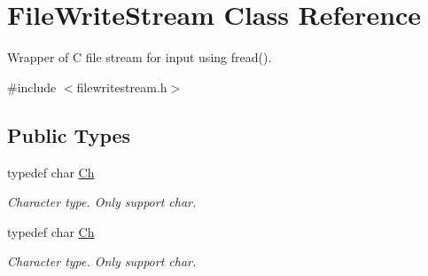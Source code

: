 \hypertarget{classFileWriteStream}{}\section{File\+Write\+Stream Class Reference}
\label{classFileWriteStream}


Wrapper of C file stream for input using fread().  




{\ttfamily \#include $<$filewritestream.\+h$>$}

\subsection*{Public Types}
\begin{DoxyCompactItemize}
\item 
\mbox{\label{classFileWriteStream_abc16aeb69ad4176263ddfcb837fb7b49}} 
typedef char \hyperlink{classFileWriteStream_abc16aeb69ad4176263ddfcb837fb7b49}{Ch}
\begin{DoxyCompactList}\small\item\em Character type. Only support char. \end{DoxyCompactList}\item 
\mbox{\label{classFileWriteStream_abc16aeb69ad4176263ddfcb837fb7b49}} 
typedef char \hyperlink{classFileWriteStream_abc16aeb69ad4176263ddfcb837fb7b49}{Ch}
\begin{DoxyCompactList}\small\item\em Character type. Only support char. \end{DoxyCompactList}\end{DoxyCompactItemize}
